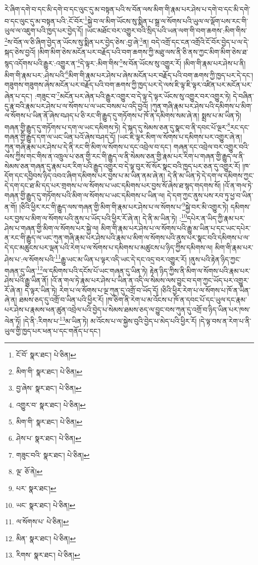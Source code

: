 རེ་ཞིག་དགེ་བ་དང་མི་དགེ་བ་དང་ལུང་དུ་མ་བསྟན་པའི་ས་བོན་ལས་མིག་གི་རྣམ་པར་ཤེས་པ་དགེ་བ་དང་མི་དགེ་བ་དང་ལུང་དུ་མ་བསྟན་པའི་:ངོ་བོར་\footnote{ངོ་བོ་  སྣར་ཐང་།  པེ་ཅིན། }སྐྱེ་བ་ལ་མིག་ཡོངས་སུ་སྨིན་པ་སྒྲ་ལ་སོགས་པའི་ཡུལ་ལ་ལྡོག་པས་རང་གི་ཡུལ་ལ་འཇུག་པའི་ཁྱད་པར་བྱེད་དོ། །ཡང་མཐོང་བར་འགྱུར་བའི་སྲིད་པའི་ཡན་ལག་གི་བག་ཆགས་:མིག་གིས་\footnote{མིག་གི་  སྣར་ཐང་།  པེ་ཅིན། }ས་བོན་ལ་ཅི་ཞིག་བྱེད་ན་ཡོངས་སུ་སྨིན་པར་བྱེད་ཅེས་:བྱ་ཞེ་\footnote{བྱ་ཞེས་  སྣར་ཐང་།  པེ་ཅིན། }ན། བདེ་འགྲོ་དང་ངན་འགྲོའི་ངོ་བོར་བྱེད་པ་ལ་དེ་སྐད་ཅེས་བྱའོ། །མིག་མིག་ཅེས་མངོན་པར་བརྗོད་པའི་བག་ཆགས་ཀྱི་མཐུ་ལས་ནི་ཅི་ནས་ཀྱང་མིག་མིག་ཅེས་ཐ་སྙད་འདོགས་པའི་རྒྱུར་:འགྱུར་ན་\footnote{འགྱུར་བ་  སྣར་ཐང་།  པེ་ཅིན། }དེ་ལྟར་:མིག་གིས་\footnote{མིག་གི་  སྣར་ཐང་།  པེ་ཅིན། }ས་བོན་ཡོངས་སུ་འགྱུར་རོ། །མིག་གི་རྣམ་པར་ཤེས་པ་ནི། མིག་གི་རྣམ་པར་:ཤེས་པའི་\footnote{ཤེས་པ་  སྣར་ཐང་།  པེ་ཅིན། }མིག་གི་རྣམ་པར་ཤེས་པ་ཞེས་མངོན་པར་བརྗོད་པའི་བག་ཆགས་ཀྱི་ཁྱད་པར་དེ་དང་། གཟུགས་གཟུགས་ཞེས་མངོན་པར་བརྗོད་པའི་བག་ཆགས་ཀྱི་ཁྱད་པར་དེ་ལས་ཇི་ལྟ་ཇི་ལྟར་འཛིན་པར་མངོན་པར་ཞེན་པ་དང་། :གཟུང་བ་\footnote{གཟུང་བའི་  སྣར་ཐང་།  པེ་ཅིན། }མངོན་པར་ཞེན་པའི་རྒྱུར་འགྱུར་བ་དེ་ལྟ་དེ་ལྟར་ཡོངས་སུ་འགྱུར་བར་འགྱུར་ཏེ། དེ་བཞིན་དུ་རྣ་བའི་རྣམ་པར་ཤེས་པ་ལ་སོགས་པ་ལ་ཡང་བསམ་པ་འདི་བྱའོ། །ཀུན་གཞི་རྣམ་པར་ཤེས་པའི་དམིགས་པ་མིག་ལ་སོགས་པ་ཡིན་ནོ་ཞེས་བཤད་པ་ཅི་རང་གི་རྒྱུད་དུ་གཏོགས་པ་ཁོ་ན་དམིགས་སམ་ཞེ་ན། སྨྲས་པ་མ་ཡིན་ཏེ། གཞན་གྱི་རྒྱུད་དུ་གཏོགས་པ་དག་ལ་ཡང་དམིགས་ཏེ། དེ་སྐད་དུ་སེམས་ཅན་དུ་སྣང་བ་ནི་དབང་པོ་ལྔར་\footnote{ལྔ་  ཅོ་ནེ། }རང་དང་གཞན་གྱི་རྒྱུད་དག་ལ་ཡང་ཡིན་པའོ་ཞེས་བཤད་དོ། །ཡང་ཇི་ལྟར་མིག་ལ་སོགས་པ་དམིགས་པར་འགྱུར་ཞེ་ན། ཀུན་གཞི་རྣམ་པར་ཤེས་པ་དེ་ནི་རང་གི་མིག་ལ་སོགས་པ་དང་འབྲེལ་བ་དང་། གཞན་དང་འབྲེལ་བར་འགྱུར་བའི་ལས་ཀྱིས་གང་གིས་ན་འཁྲུལ་པ་ཅན་གྱི་རང་གི་རྒྱུད་ལ་ནི་སེམས་ཅན་གྱི་རྣམ་པར་རིག་པ་གཞན་གྱི་རྒྱུད་ལ་ནི་སེམས་ཅན་གཞན་དུ་རྣམ་པར་རིག་པའི་རྒྱུད་འགྱུར་བ་དེ་ལྟ་བུར་སོ་སོར་སྣང་བའི་ཁྱད་པར་ཅན་དུ་འགྱུར་རོ། །ཁ་དོག་དང་དབྱིབས་ཉིད་འབའ་ཞིག་དམིགས་པར་བྱས་པ་མ་ཡིན་ནམ་ཞེ་ན། དེ་ནི་མ་ཡིན་ཏེ་དེ་དག་ལ་དམིགས་ཀྱང་དེ་དག་དང་ཐ་མི་དད་པར་གྲགས་པ་ལ་སོགས་པ་ཡང་དམིགས་པར་བྱས་སོ་ཞེས་ཐ་སྙད་གདགས་སོ། །འོ་ན་གལ་ཏེ་གཞན་གྱི་རྒྱུད་དུ་གཏོགས་པའི་མིག་ལ་སོགས་པ་ཡང་དམིགས་པ་ཡིན་ལ། དེ་དག་ཀྱང་ནུས་པས་རབ་ཏུ་ཕྱ་བ་ཡིན་ན་གོ། །ཅིའི་ཕྱིར་རང་གི་རྒྱུད་ལས་གཞན་གྱི་མིག་གི་རྣམ་པར་ཤེས་པ་ལ་སོགས་པ་\footnote{པར་  སྣར་ཐང་། }སྐྱེ་བར་མི་འགྱུར་ཏེ། དམིགས་པར་བྱས་པ་མིག་ལ་སོགས་པའི་ནུས་པ་ཡོད་པའི་ཕྱིར་རོ་ཞེ་ན། དེ་ནི་མ་ཡིན་ཏེ། :\footnote{ཡང་  སྣར་ཐང་།  པེ་ཅིན། }དཔེར་ན་ཡིད་ཀྱི་རྣམ་པར་ཤེས་པ་གཞན་གྱི་མིག་ལ་སོགས་པར་སྐྱེ་ལ། མིག་གི་རྣམ་པར་ཤེས་པ་ལ་སོགས་པའི་རྒྱུ་མ་ཡིན་པ་དང་ཡང་དཔེར་ན་རང་གི་རྒྱུད་ལ་ཡང་ཀུན་གཞི་རྣམ་པར་ཤེས་པའི་རྣམ་པ་མིག་ལ་སོགས་པའི་ནུས་པར་སྣང་བའི་དམིགས་པ་ལ་དེ་དང་མཚུངས་པར་ལྡན་པའི་རེག་པ་ལ་སོགས་པ་དམིགས་པ་མཚུངས་པ་ཉིད་ཀྱིས་དམིགས་ལ། མིག་གི་རྣམ་པར་ཤེས་པ་:ལ་སོགས་པའི་\footnote{ལ་སོགས་པ་  པེ་ཅིན། }རྒྱུ་ཡང་མ་ཡིན་པ་ལྟར་འདི་ཡང་དེ་དང་འདྲ་བར་འགྱུར་རོ། །ནུས་པའི་རྟེན་ཉིད་ཀྱང་གཞན་དུ་ཡིན་\footnote{མིན་  སྣར་ཐང་།  པེ་ཅིན། }ལ་དམིགས་པའི་དངོས་པོ་ཡང་གཞན་དུ་ཡིན་ཏེ། རྟེན་ཉིད་ཀྱིས་ནི་མིག་ལ་སོགས་པའི་རྣམ་པར་ཤེས་པའི་རྒྱུ་ཡིན་ནོ། །འོ་ན་གལ་ཏེ་རྣམ་པར་ཤེས་པ་ཡིན་ན་འདི་ལ་སེམས་ལས་བྱུང་བ་དག་ཀྱང་ཡོད་པར་འགྱུར་རོ་ཞེ་ན། དེ་ལྟར་ཡིན་ཏེ། རེག་པ་ལ་སོགས་པ་ལྔ་ཀུན་དུ་འགྲོ་བ་ཡོད་དོ། །ཅིའི་ཕྱིར་རེག་པ་ལ་སོགས་པ་ཁོ་ན་ཡིན་ཞེ་ན། ཐམས་ཅད་དུ་འགྲོ་བ་ཡིན་པའི་ཕྱིར་རོ། །ཁ་ཅིག་ནི་རེག་པ་མ་འོངས་པ་ཁོ་ན་དབང་པོ་དང་ཡུལ་དང་རྣམ་པར་ཤེས་པ་རྣམས་ཕན་ཚུན་འབྲེལ་པའི་བྱེད་པ་སེམས་ཐམས་ཅད་ལ་བྱུང་བས་ཀུན་དུ་འགྲོ་བ་ཉིད་ཡིན་པར་ཁས་ལེན་ཏོ། །དེ་ནི་:རིགས་པ་\footnote{རིགས་  སྣར་ཐང་།  པེ་ཅིན། }མ་ཡིན་ཏེ། མ་འོངས་པ་ལ་སྐྱེས་བུའི་བྱེད་པ་མེད་པའི་ཕྱིར་རོ། །དེ་ལྟ་བས་ན་རེག་པ་ནི་ཡུལ་གྱི་ཁྱད་པར་ཕན་པ་དང་གནོད་པ་དང་། 